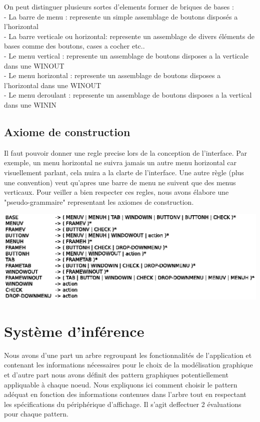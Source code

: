 \documentclass[fleqn]{article-hermes}
\begin{document}
On peut distinguer plusieurs sortes d'elements former de briques de bases :\\
- La barre de menu : represente un simple assemblage de boutons disposés a l'horizontal\\
- La barre verticale ou horizontal: represente un assemblage de divers éléments de bases comme des boutons, cases a cocher etc..\\
- Le menu vertical : represente un assemblage de boutons disposes a la verticale dans une WINOUT\\
- Le menu horizontal : represente un assemblage de boutons disposes a l'horizontal dans une WINOUT\\
- Le menu deroulant : represente un assemblage de boutons disposes a la vertical dans une WININ\\


\subsection{Axiome de construction}
Il faut pouvoir donner une regle precise lors de la conception de l'interface. Par exemple, un menu horizontal
ne suivra jamais un autre menu horizontal car visuellement parlant, cela nuira a la clarte de l'interface. Une autre 
règle (plus une convention) veut qu'apres une barre de menu ne suivent que des menus verticaux.
Pour veiller a bien respecter ces regles, nous avons élabore une "pseudo-grammaire" representant les axiomes de construction.\\

\begin{center}
\includegraphics[scale=0.8]{figures/grammaire.ps}
\end{center}


\section{Système d'inférence}
Nous avons d'une part un arbre regroupant les fonctionnalités de l'application et contenant les informations nécessaires pour le choix de la modélisation graphique et d'autre part nous avons définit des pattern graphiques potentiellement appliquable à chaque noeud. Nous expliquons ici comment choisir le pattern adéquat en fonction des informations contenues dans l'arbre tout en respectant les spécifications du périphérique d'affichage. Il s'agit deffectuer 2 évaluations pour chaque pattern.
\end{document}
